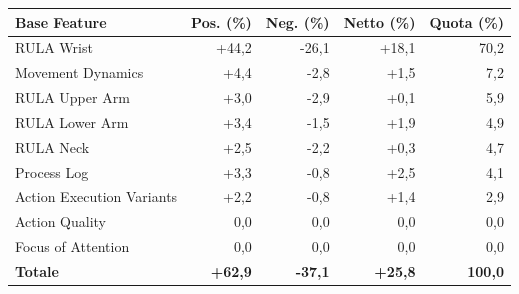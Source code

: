 \begin{tabular*}{\linewidth}{@{}l@{\extracolsep{\fill}}rrrr@{}}
\toprule
\textbf{Base Feature} & \textbf{Pos. (\%)} & \textbf{Neg. (\%)} & \textbf{Netto (\%)} & \textbf{Quota (\%)} \\
\midrule
RULA Wrist & +44{,}2 & -26{,}1 & +18{,}1 & 70{,}2 \\
Movement Dynamics & +4{,}4 & -2{,}8 & +1{,}5 & 7{,}2 \\
RULA Upper Arm & +3{,}0 & -2{,}9 & +0{,}1 & 5{,}9 \\
RULA Lower Arm & +3{,}4 & -1{,}5 & +1{,}9 & 4{,}9 \\
RULA Neck & +2{,}5 & -2{,}2 & +0{,}3 & 4{,}7 \\
Process Log & +3{,}3 & -0{,}8 & +2{,}5 & 4{,}1 \\
Action Execution Variants & +2{,}2 & -0{,}8 & +1{,}4 & 2{,}9 \\
Action Quality & 0{,}0 & 0{,}0 & 0{,}0 & 0{,}0 \\
Focus of Attention & 0{,}0 & 0{,}0 & 0{,}0 & 0{,}0 \\
\midrule
\textbf{Totale} & \textbf{+62{,}9} & \textbf{-37{,}1} & \textbf{+25{,}8} & \textbf{100{,}0} \\
\bottomrule
\end{tabular*}
